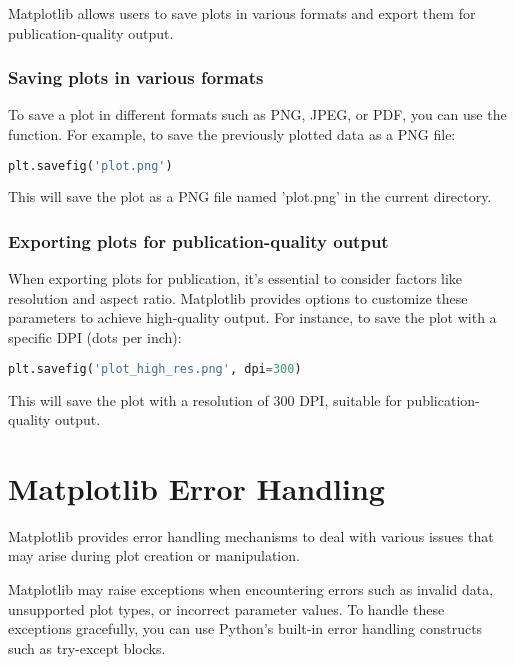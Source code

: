 Matplotlib allows users to save plots in various formats and export them for publication-quality output.

\subsubsection*{Saving plots in various formats}

To save a plot in different formats such as PNG, JPEG, or PDF, you can use the  function. For example, to save the previously plotted data as a PNG file:

\begin{lstlisting}[language=Python, caption={Saving a plot as PNG}]
	plt.savefig('plot.png')
\end{lstlisting}

This will save the plot as a PNG file named 'plot.png' in the current directory.

\subsubsection*{Exporting plots for publication-quality output}

When exporting plots for publication, it's essential to consider factors like resolution and aspect ratio. Matplotlib provides options to customize these parameters to achieve high-quality output. For instance, to save the plot with a specific DPI (dots per inch):

\begin{lstlisting}[language=Python, caption={Exporting a high-resolution plot}]
	plt.savefig('plot_high_res.png', dpi=300)
\end{lstlisting}

This will save the plot with a resolution of 300 DPI, suitable for publication-quality output.

\section{Matplotlib Error Handling}

Matplotlib provides error handling mechanisms to deal with various issues that may arise during plot creation or manipulation.

Matplotlib may raise exceptions when encountering errors such as invalid data, unsupported plot types, or incorrect parameter values. To handle these exceptions gracefully, you can use Python's built-in error handling constructs such as try-except blocks.

